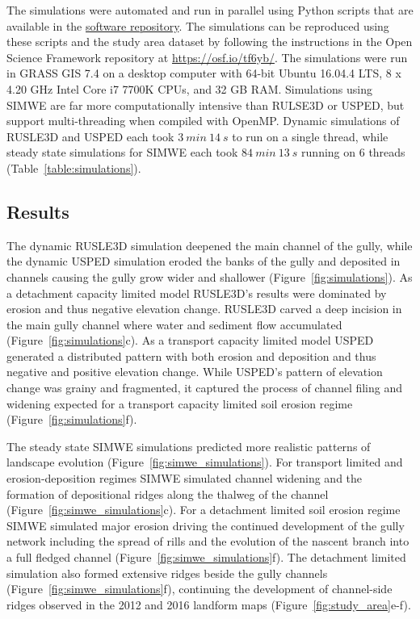 \documentclass[esurf, manuscript]{copernicus}
\begin{document}
The simulations were automated and run in parallel
using Python scripts that are available in the 
\href{https://github.com/baharmon/landscape_evolution}{software repository}.
The simulations can be reproduced using these scripts
and the study area dataset 
by following the instructions 
in the Open Science Framework repository 
at \url{https://osf.io/tf6yb/}.
The simulations were run 
in GRASS GIS 7.4 
on a desktop computer 
with 64-bit Ubuntu 16.04.4 LTS,
8 x 4.20 GHz Intel Core i7 7700K CPUs,
and 32 GB RAM. 
Simulations using SIMWE 
are far more computationally intensive
than RULSE3D or USPED, 
but support multi-threading 
when compiled with OpenMP. 
Dynamic simulations of RUSLE3D and USPED each took
$3~min~14~s$ to run on a single thread, 
while steady state simulations for SIMWE each took 
$84~min~13~s$ running on 6 threads
(Table~\ref{table:simulations}).


\subsection{Results}

The dynamic RUSLE3D simulation
deepened the main channel of the gully,
while the dynamic USPED simulation
eroded the banks of the gully
and deposited in channels
causing the gully grow wider and shallower
(Figure~\ref{fig:simulations}). 
%
As a detachment capacity limited model
RUSLE3D's results were
dominated by erosion and 
thus negative elevation change.
%
RUSLE3D carved a deep incision 
in the main gully channel
where water and sediment flow accumulated
(Figure~\ref{fig:simulations}c). 
%
As a transport capacity limited model
USPED generated a distributed pattern
with both erosion and deposition and thus
negative and positive elevation change. 
%
While USPED's pattern of elevation change
was grainy and fragmented, 
it captured the process of channel 
filing and widening expected for 
a transport capacity limited soil erosion regime
(Figure~\ref{fig:simulations}f). 

The steady state SIMWE simulations 
predicted more realistic patterns 
of landscape evolution
(Figure~\ref{fig:simwe_simulations}). 
%
For transport limited and
erosion-deposition regimes
SIMWE simulated
channel widening 
and the formation of depositional ridges
along the thalweg of the channel
(Figure~\ref{fig:simwe_simulations}c).
%
For a detachment limited soil erosion regime
SIMWE simulated major erosion
driving the continued development 
of the gully network
including the spread of rills and
the evolution of the nascent branch
into a full fledged channel
(Figure~\ref{fig:simwe_simulations}f). 
%
The detachment limited simulation
also formed extensive ridges
beside the gully channels 
(Figure~\ref{fig:simwe_simulations}f), 
continuing the development of 
channel-side ridges
observed in the 2012 and 2016 landform maps
(Figure~\ref{fig:study_area}e-f). 
\end{document}
